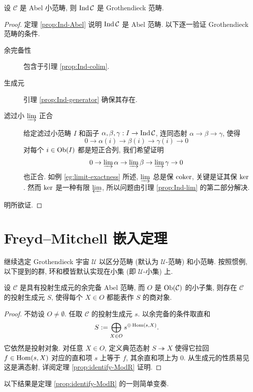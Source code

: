 \begin{theorem}\label{prop:Ind-Grothendieck}
	设 $\mathcal{C}$ 是 Abel 小范畴, 则 $\operatorname{Ind}\mathcal{C}$ 是 Grothendieck 范畴.
\end{theorem}
\begin{proof}
	定理 \ref{prop:Ind-Abel} 说明 $\operatorname{Ind}\mathcal{C}$ 是 Abel 范畴. 以下逐一验证 Grothendieck 范畴的条件.
	\begin{description}
		\item[余完备性] 包含于引理 \ref{prop:Ind-colim}.
		\item[生成元] 引理 \ref{prop:Ind-generator} 确保其存在.
		\item[滤过小 $\varinjlim$ 正合] 给定滤过小范畴 $I$ 和函子 $\alpha, \beta, \gamma: I \to \operatorname{Ind}\mathcal{C}$, 连同态射 $\alpha \to \beta \to \gamma$, 使得
		\[ 0 \to \alpha(i) \to \beta(i) \to \gamma(i) \to 0 \]
		对每个 $i \in \operatorname{Ob}(I)$ 都是短正合列, 我们希望证明
		\[ 0 \to \varinjlim \alpha \to \varinjlim \beta \to \varinjlim \gamma \to 0 \]
		也正合. 如例 \ref{eg:limit-exactness} 所述, $\varinjlim$ 总是保 $\operatorname{coker}$, 关键是证其保 $\operatorname{ker}$. 然而 $\operatorname{ker}$ 是一种有限 $\varprojlim$, 所以问题由引理 \ref{prop:Ind-lim} 的第二部分解决.
	\end{description}
	明所欲证.
\end{proof}

\section{Freyd--Mitchell 嵌入定理}\label{sec:FM}
继续选定 Grothendieck 宇宙 $\mathcal{U}$ 以区分范畴 (默认为 $\mathcal{U}$-范畴) 和小范畴. 按照惯例, 以下提到的群, 环和模皆默认实现在小集 (即 $\mathcal{U}$-小集) 上.

\begin{lemma}\label{prop:FM-prep-1}
	设 $\mathcal{C}$ 是具有投射生成元的余完备 Abel 范畴, 而 $O$ 是 $\operatorname{Ob}(\mathcal{C})$ 的小子集, 则存在 $\mathcal{C}$ 的投射生成元 $S$, 使得每个 $X \in O$ 都能表作 $S$ 的商对象.
\end{lemma}
\begin{proof}
	不妨设 $O \neq \emptyset$. 任取 $\mathcal{C}$ 的投射生成元 $s$. 以余完备的条件取直和
	\[ S := \bigoplus_{X \in O} s^{\oplus \operatorname{Hom}(s, X)}. \]
	它依然是投射对象. 对任意 $X \in O$, 定义典范态射 $S \twoheadrightarrow X$ 使得它拉回 $f \in \operatorname{Hom}(s, X)$ 对应的直和项 $s$ 上等于 $f$, 其余直和项上为 $0$. 从生成元的性质易见这是满态射, 详阅定理 \ref{prop:identify-ModR} 证明.
\end{proof}

以下结果是定理 \ref{prop:identify-ModR} 的一则简单变奏.

